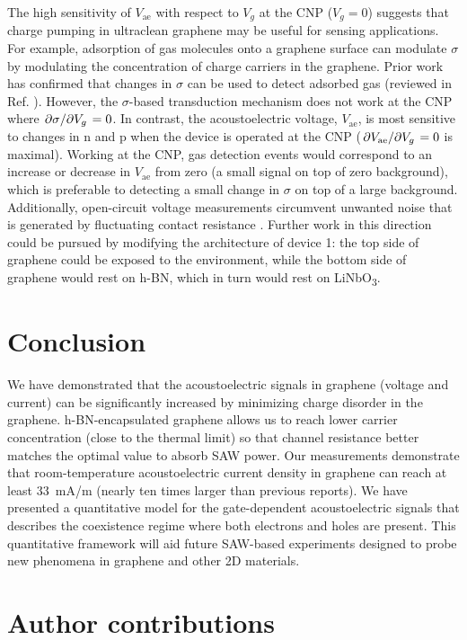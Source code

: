 \documentclass[double,12pt,1in,seploa]{beavtex}
\let\Oldsection\section
\renewcommand{\section}{\FloatBarrier\Oldsection}
\begin{document}
The high sensitivity of $V_{\mathrm{ae}}$ with respect to $V_g$ at the CNP ($V_g = 0$) suggests that charge pumping in ultraclean graphene may be useful for sensing applications. For example, adsorption of gas molecules onto a graphene surface can modulate $\sigma$ by modulating the concentration of charge carriers in the graphene. Prior work has confirmed that changes in $\sigma$ can be used to detect adsorbed gas (reviewed in Ref. \cite{yang_gas_2017}). However, the $\sigma$-based transduction mechanism does not work at the CNP where $\pdv*{\sigma}{V_g} = 0$. In contrast, the acoustoelectric voltage, $V_{\mathrm{ae}}$, is most sensitive to changes in n and p when the device is operated at the CNP ($\pdv*{V_{\mathrm{ae}}}{V_g} = 0$ is maximal). Working at the CNP, gas detection events would correspond to an increase or decrease in $V_{\mathrm{ae}}$ from zero (a small signal on top of zero background), which is preferable to detecting a small change in $\sigma$ on top of a large background. Additionally, open-circuit voltage measurements circumvent unwanted noise that is generated by fluctuating contact resistance \cite{schaefer_improved_2020}. Further work in this direction could be pursued by modifying the architecture of device 1: the top side of graphene could be exposed to the environment, while the bottom side of graphene would rest on h-BN, which in turn would rest on LiNbO\textsubscript{3}.


\section{Conclusion}
We have demonstrated that the acoustoelectric signals in graphene (voltage and current) can be significantly increased by minimizing charge disorder in the graphene. h-BN-encapsulated graphene allows us to reach lower carrier concentration (close to the thermal limit) so that channel resistance better matches the optimal value to absorb SAW power. Our measurements demonstrate that room-temperature acoustoelectric current density in graphene can reach at least \SI{33}{\milli\ampere/\meter} (nearly ten times larger than previous reports). We have presented a quantitative model for the gate-dependent acoustoelectric signals that describes the coexistence regime where both electrons and holes are present. This quantitative framework will aid future SAW-based experiments designed to probe new phenomena in graphene and other 2D materials.


\section{Author contributions}
\end{document}
